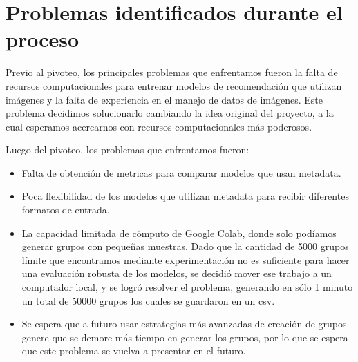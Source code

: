 \documentclass[11pt]{article}
\begin{document}

\section{Problemas identificados durante el proceso} 

Previo al pivoteo, los principales problemas que enfrentamos fueron la falta de recursos computacionales para entrenar modelos de recomendación que utilizan imágenes y la falta de experiencia en el manejo de datos de imágenes. Este problema decidimos solucionarlo cambiando la idea original del proyecto, a la cual esperamos acercarnos con recursos computacionales más poderosos.

Luego del pivoteo, los problemas que enfrentamos fueron:
\begin{itemize}
    \item Falta de obtención de metricas para comparar modelos que usan metadata.
    \item Poca flexibilidad de los modelos que utilizan metadata para recibir diferentes formatos de entrada.
    \item La capacidad limitada de cómputo de Google Colab, donde solo podíamos generar grupos con pequeñas muestras. Dado que la cantidad de 5000 grupos límite que encontramos mediante experimentación no es suficiente para hacer una evaluación robusta de los modelos, se decidió mover ese trabajo a un computador local, y se logró resolver el problema, generando en sólo 1 minuto un total de 50000 grupos los cuales se guardaron en un csv.
    \item Se espera que a futuro usar estrategias más avanzadas de creación de grupos genere que se demore más tiempo en generar los grupos, por lo que se espera que este problema se vuelva a presentar en el futuro.
\end{itemize}
\end{document}
